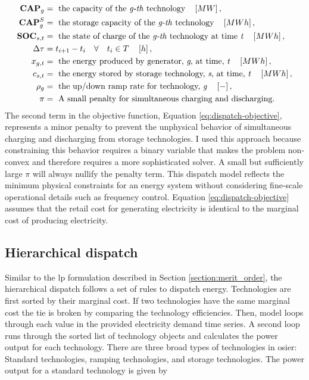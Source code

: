 \begin{align}
    \textbf{CAP}_g &= \text{ the capacity of the \textit{g-th} technology}\quad \left[MW\right],\nonumber\\
    \textbf{CAP}^S_g &= \text{ the storage capacity of the \textit{g-th} technology}\quad \left[MWh\right],\nonumber\\
    \textbf{SOC}_{s,t} &= \text{ the state of charge of the \textit{g-th} technology at time \textit{t}}\quad \left[MWh\right]\nonumber,\\
    \Delta\tau &= t_{i+1} - t_i \quad \forall \quad t_i \in T \quad \left[h\right],\nonumber\\
    x_{g,t} &= \text{ the energy produced by generator, \textit{g}, at time, \textit{t}}\quad \left[MWh\right]\nonumber,\\
    c_{s,t} &= \text{ the energy stored by storage technology, \textit{s}, at time, \textit{t}}\quad \left[MWh\right]\nonumber,\\
    \rho_g &= \text{ the up/down ramp rate for technology, \textit{g}} \quad \left[-\right]\nonumber,\\
    \pi &= \text{ A small penalty for simultaneous charging and discharging.}\nonumber
\end{align}
The second term in the objective function, Equation \ref{eq:dispatch-objective},
represents a minor penalty to prevent the unphysical behavior of simultaneous
charging and discharging from storage technologies. I used this approach because
constraining this behavior requires a binary variable that makes the problem
non-convex and therefore requires a more sophisticated solver. A small but
sufficiently large $\pi$ will always nullify the penalty term. This dispatch
model reflects the minimum physical constraints for an energy system without
considering fine-scale operational details such as frequency control. Equation
\ref{eq:dispatch-objective} assumes that the retail cost for generating
electricity is identical to the marginal cost of producing electricity. 

\subsection{Hierarchical dispatch}

Similar to the \ac{lp} formulation described in Section
\ref{section:merit_order}, the hierarchical dispatch follows a set of rules to
dispatch energy. Technologies are first sorted by their marginal cost. If two
technologies have the same marginal cost the tie is broken by comparing the 
technology efficiencies. Then, model loops through each value in the provided 
electricity demand time series. A second loop runs through the sorted list of 
technology objects and calculates the power output for each technology. There
are three broad types of technologies in \ac{osier}: Standard technologies,
ramping technologies, and storage technologies. The power output for a standard
technology is given by

